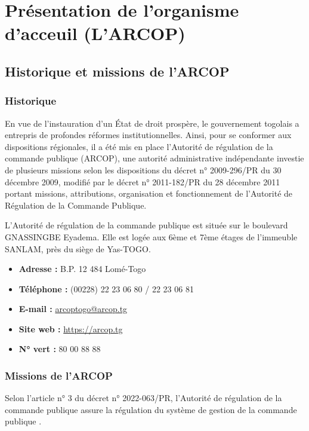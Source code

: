\chapter{Présentation de l'organisme d'acceuil (L'\ac{ARCOP})}
\clearpage
\section{Historique et missions de l’\ac{ARCOP}}

\subsection{Historique}
En vue de l’instauration d’un État de droit prospère, le gouvernement togolais a entrepris de profondes réformes institutionnelles. Ainsi, pour se conformer aux dispositions régionales, il a été mis en place l’Autorité de régulation de la commande publique (\ac{ARCOP}), une autorité administrative indépendante investie de plusieurs missions selon les dispositions du décret n° 2009-296/PR du 30 décembre 2009, modifié par le décret n° 2011-182/PR du 28 décembre 2011 portant missions, attributions, organisation et fonctionnement de l’Autorité de Régulation de la Commande Publique.

L’Autorité de régulation de la commande publique est située sur le boulevard GNASSINGBE Eyadema. Elle est logée aux 6ème et 7ème étages de l’immeuble SANLAM, près du siège de Yas-TOGO.

\begin{itemize}
    \item \textbf{Adresse :} B.P. 12 484 Lomé-Togo
    \item \textbf{Téléphone :} (00228) 22 23 06 80 / 22 23 06 81
    \item \textbf{E-mail :} \href{arcoptogo@arcop.tg}{arcoptogo@arcop.tg}
    \item \textbf{Site web :} \href{https://arcop.tg}{https://arcop.tg}
    \item \textbf{N° vert :} 80 00 88 88
\end{itemize}

\subsection{Missions de l’\ac{ARCOP}}
Selon l’article n° 3 du décret n° 2022-063/PR, \og l’Autorité de régulation de la commande publique assure la régulation du système de gestion de la commande publique \fg.

